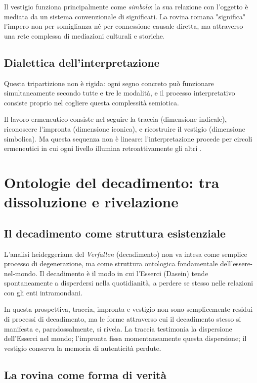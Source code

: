 \documentclass{gs}
\begin{document}
Il vestigio funziona principalmente come \textit{simbolo}: la sua relazione con l'oggetto è mediata da un sistema convenzionale di significati. La rovina romana "significa" l'impero non per somiglianza né per connessione causale diretta, ma attraverso una rete complessa di mediazioni culturali e storiche.

\subsection{Dialettica dell'interpretazione}

Questa tripartizione non è rigida: ogni segno concreto può funzionare simultaneamente secondo tutte e tre le modalità, e il processo interpretativo consiste proprio nel cogliere questa complessità semiotica.

Il lavoro ermeneutico consiste nel seguire la traccia (dimensione indicale), riconoscere l'impronta (dimensione iconica), e ricostruire il vestigio (dimensione simbolica). Ma questa sequenza non è lineare: l'interpretazione procede per circoli ermeneutici in cui ogni livello illumina retroattivamente gli altri \cite{gadamer1960}.

\section{Ontologie del decadimento: tra dissoluzione e rivelazione}

\subsection{Il decadimento come struttura esistenziale}

L'analisi heideggeriana del \textit{Verfallen} (decadimento) \cite{heidegger1927} non va intesa come semplice processo di degenerazione, ma come struttura ontologica fondamentale dell'essere-nel-mondo. Il decadimento è il modo in cui l'Esserci (Dasein) tende spontaneamente a disperdersi nella quotidianità, a perdere se stesso nelle relazioni con gli enti intramondani.

In questa prospettiva, traccia, impronta e vestigio non sono semplicemente residui di processi di decadimento, ma le forme attraverso cui il decadimento stesso si manifesta e, paradossalmente, si rivela. La traccia testimonia la dispersione dell'Esserci nel mondo; l'impronta fissa momentaneamente questa dispersione; il vestigio conserva la memoria di autenticità perdute.

\subsection{La rovina come forma di verità}
\end{document}
